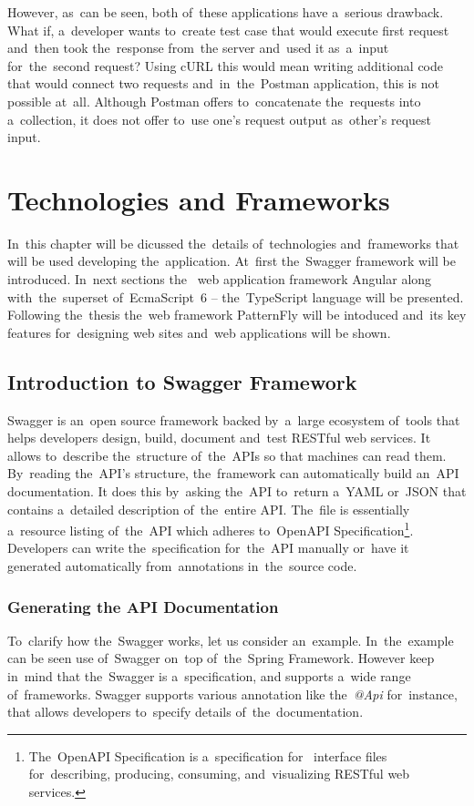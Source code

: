 However, as~can be seen, both of~these applications have a~serious drawback.
What if, a~developer wants to~create test case that would execute first request
and~then took the~response from~the server and~used it as~a~input for~the~second
request? Using cURL this would mean writing additional code that would connect
two requests and~in~the~Postman application, this is not possible at~all.
Although Postman offers to~concatenate the~requests into a~collection, it does
not offer to~use one's request output as~other's request input.

\chapter{Technologies and Frameworks}
\label{Technologies}
In~this chapter will be dicussed the~details of~technologies
and~frameworks that will be used developing the~application. At~first
the~Swagger framework will be introduced.
In~next sections the~ web application framework Angular along with~the~superset of~EcmaScript~6 -- the~TypeScript language will be
presented. Following the~thesis the~web framework
PatternFly will be intoduced and~its key features for~designing web sites
and~web applications will be shown.

\section{Introduction to Swagger Framework}
Swagger is an~open source framework backed by~a~large ecosystem of~tools that
helps developers design, build, document and~test RESTful web services. It
allows to~describe the~structure of~the~APIs so that machines can read them.
By~reading the~API's structure, the~framework can automatically build an~API
documentation. It does this by~asking the~API to~return a~YAML or~JSON that
contains a~detailed description of~the~entire API. The~file is essentially
a~resource listing of~the~API which adheres to~OpenAPI
Specification\footnote{The~OpenAPI Specification is a~specification
for~ interface files for~describing, producing, consuming,
and~visualizing RESTful web services.}. Developers can write the~specification
for~the~API manually or~have it generated automatically from~annotations
in~the~source code.

\subsection{Generating the API Documentation}
To~clarify how the~Swagger works, let us consider an~example. In~the~example can
be seen use of~Swagger on~top of~the~Spring Framework. However keep
in~mind that the~Swagger is a~specification, and supports a~wide range of~frameworks. Swagger
supports various annotation like the~\textit{@Api} for~instance, that allows
developers to~specify details of~the~documentation.

